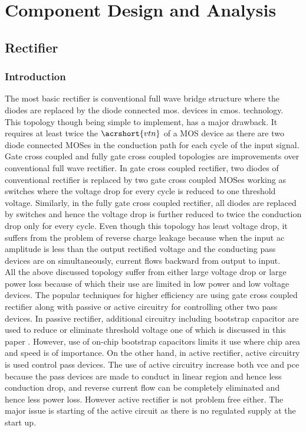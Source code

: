 \documentclass[12pt,a4paper,UKenglish]{report}
\begin{document}
\part{Component Design and Analysis}    

\chapter{Rectifier}  

\section{Introduction}	 	%

The most basic rectifier is conventional full wave bridge structure where the diodes are replaced by the diode connected \acrshort{mos}. devices in \acrshort{cmos}. technology. This topology though being simple to implement, has a major drawback. It requires at least twice the $\acrshort{vtn}$ of a MOS device as there are two diode connected MOSes in the conduction path for each cycle of the input signal.  \\

Gate cross coupled and fully gate cross coupled topologies are improvements over conventional full wave rectifier. In gate cross coupled rectifier, two diodes of conventional rectifier is replaced by two gate cross coupled MOSes working as switches where the voltage drop for every cycle is reduced to one threshold voltage. Similarly, in the fully gate cross coupled rectifier, all diodes are replaced by switches and hence the voltage drop is further reduced to twice the conduction drop only for every cycle. Even though this topology has least voltage drop, it suffers from the problem of reverse charge leakage because when the input ac amplitude is less than the output rectified voltage and the conducting pass devices are on simultaneously, current flows backward from output to input. \\

All the above discussed topology suffer from either large voltage drop or large power loss because of which their use are limited in low power and low voltage devices. The popular techniques for higher efficiency are using gate cross coupled rectifier along with passive or active circuitry  for controlling other two pass devices. In passive rectifier, additional circuitry including bootstrap capacitor are used to reduce or eliminate threshold voltage one of which is discussed in this paper \cite{rectboot}. However, use of on-chip bootstrap capacitors limits it use where chip area and speed is of importance. On the other hand, in active rectifier, active circuitry is used control pass devices. The use of active circuitry increase both  \gls{vce} and  \gls{pce} because the pass devices are made to conduct in linear region and hence less conduction drop, and reverse current flow can be completely eliminated and hence less power loss. However active rectifier is not problem free either. The major issue is starting of the active circuit as there is no regulated supply at the start up. \\
\end{document}
